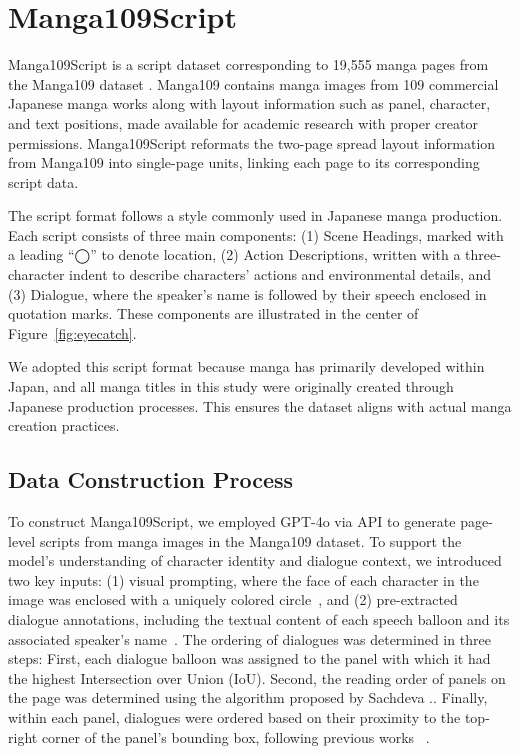 \section{Manga109Script}
Manga109Script is a script dataset corresponding to 19,555 manga pages from the Manga109 dataset \cite{matsui2017sketch,aizawa_building_2020}. Manga109 contains manga images from 109 commercial Japanese manga works along with layout information such as panel, character, and text positions, made available for academic research with proper creator permissions. Manga109Script reformats the two-page spread layout information from Manga109 into single-page units, linking each page to its corresponding script data.

The script format follows a style commonly used in Japanese manga production. Each script consists of three main components:
(1) Scene Headings, marked with a leading “◯” to denote location,
(2) Action Descriptions, written with a three-character indent to describe characters’ actions and environmental details, and
(3) Dialogue, where the speaker’s name is followed by their speech enclosed in quotation marks.
These components are illustrated in the center of Figure~\ref{fig:eyecatch}.

We adopted this script format because manga has primarily developed within Japan, and all manga titles in this study were originally created through Japanese production processes. This ensures the dataset aligns with actual manga creation practices.

\subsection{Data Construction Process}
To construct Manga109Script, we employed GPT-4o via API to generate page-level scripts from manga images in the Manga109 dataset. To support the model's understanding of character identity and dialogue context, we introduced two key inputs: (1) visual prompting, where the face of each character in the image was enclosed with a uniquely colored circle~\cite{shtedritski_what_2023}, and (2) pre-extracted dialogue annotations, including the textual content of each speech balloon and its associated speaker's name~\cite{li_manga109dialog_2024}. The ordering of dialogues was determined in three steps: First, each dialogue balloon was assigned to the panel with which it had the highest Intersection over Union (IoU). Second, the reading order of panels on the page was determined using the algorithm proposed by Sachdeva \etal.\cite{sachdeva_manga_2024}. Finally, within each panel, dialogues were ordered based on their proximity to the top-right corner of the panel’s bounding box, following previous works~\cite{vivoli_comicap_2024, sachdeva_manga_2024, hinami_towards_2021} .

